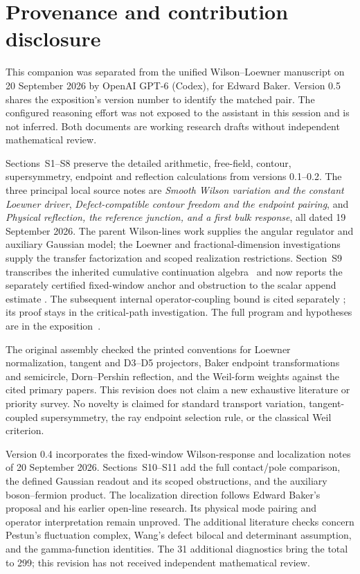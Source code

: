 \section{Provenance and contribution disclosure}\label{app:provenance}

This companion was separated from the unified Wilson--Loewner
manuscript on 20 September 2026 by OpenAI GPT-6 (Codex), for
Edward Baker. Version 0.5 shares the exposition's version number
to identify the matched pair. The configured reasoning effort
was not exposed to the assistant in this session and is not
inferred. Both documents are working research drafts without
independent mathematical review.

Sections~S1--S8 preserve the detailed arithmetic, free-field,
contour, supersymmetry, endpoint and reflection calculations from
versions 0.1--0.2. The three principal local source notes are
\emph{Smooth Wilson variation and the constant Loewner driver},
\emph{Defect-compatible contour freedom and the endpoint pairing},
and \emph{Physical reflection, the reference junction, and a first
bulk response}, all dated 19 September 2026. The parent
Wilson-lines work supplies the angular regulator and auxiliary
Gaussian model; the Loewner and fractional-dimension investigations
supply the transfer factorization and scoped realization restrictions.
Section~S9 transcribes the inherited cumulative continuation
algebra~\cite{CumulativePath} and now reports the separately
certified fixed-window anchor and obstruction to the scalar append
estimate \cite{EMAAnchor,CumulativeAppend}. The subsequent internal operator-coupling bound is cited separately
\cite{CumulativeCoupling}; its proof stays in the critical-path investigation. The full program and hypotheses are in the
exposition~\cite{Exposition}.

The original assembly checked the printed conventions for Loewner
normalization, tangent and D3--D5 projectors, Baker endpoint
transformations and semicircle, Dorn--Pershin reflection, and the
Weil-form weights against the cited primary papers. This revision
does not claim a new exhaustive literature or priority survey.
No novelty is claimed for standard transport variation,
tangent-coupled supersymmetry, the ray endpoint selection rule,
or the classical Weil criterion.

Version 0.4 incorporates the fixed-window Wilson-response and
localization notes of 20 September 2026. Sections~S10--S11 add the
full contact/pole comparison, the defined Gaussian readout and its
scoped obstructions, and the auxiliary boson--fermion product.
The localization direction follows Edward Baker's proposal and
his earlier open-line research. Its physical mode pairing and
operator interpretation remain unproved. The additional literature
checks concern Pestun's fluctuation complex, Wang's defect bilocal
and determinant assumption, and the gamma-function identities.
The 31 additional diagnostics bring the total to 299; this revision
has not received independent mathematical review.

